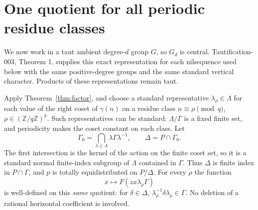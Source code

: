 \documentclass[11pt]{article}
\newcommand{\Z}{\mathbb Z}\newcommand{\R}{\mathbb R}
\begin{document}
\section{One quotient for all periodic residue classes}
We now work in a taut ambient degree-$d$ group $G$, so $G_d$ is central.
Tautification-003, Theorem 1, supplies this exact representation for each
nilsequence used below with the same positive-degree groups and the same
standard vertical character. Products of these representations remain taut.

Apply Theorem~\ref{thm:factor}, and choose a standard representative
$\lambda_\rho\in\Lambda$ for each value of the right coset of $\gamma(n)$
on a residue class $n\equiv\rho\pmod q$, $\rho\in(\Z/q\Z)^k$.
Such representatives can be standard: $\Lambda/\Gamma$ is a fixed finite
set, and periodicity makes the coset constant on each class. Let
\[
 \Gamma_0=\bigcap_{\lambda\in\Lambda}\lambda\Gamma\lambda^{-1},
 \qquad \Delta=P\cap\Gamma_0.                                \tag{7}
\]
The first intersection is the kernel of the action on the finite coset set,
so it is a standard normal finite-index subgroup of $\Lambda$ contained in
$\Gamma$. Thus $\Delta$ is finite index in $P\cap\Gamma$, and $p$ is
totally equidistributed on $P/\Delta$. For every $\rho$ the function
\[
                      x\longmapsto F(zx\lambda_\rho\Gamma)   \tag{8}
\]
is well-defined on this \emph{same} quotient: for $\delta\in\Delta$,
$\lambda_\rho^{-1}\delta\lambda_\rho\in\Gamma$.
No deletion of a rational horizontal coefficient is involved.
\end{document}
